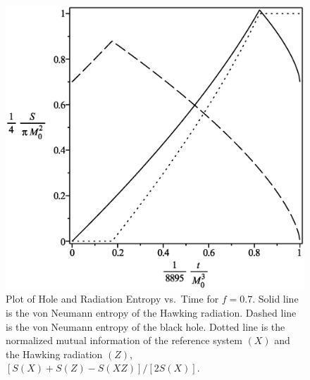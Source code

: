 \documentclass[12pt]{article}
\begin{document}
\begin{figure}[H]
\centering
\includegraphics[width=1\textwidth]{Hawking-hole-radiation-mutual-entropy-vs-time-graph-10f-is-7.eps}
\caption{Plot of Hole and Radiation Entropy vs.\ Time for $f=0.7$.
Solid line is the von Neumann entropy of the Hawking radiation.
Dashed line is the von Neumann entropy of the black hole.
Dotted line is the normalized mutual information of the reference system $(X)$ and the Hawking radiation $(Z)$, $[S(X)+S(Z)-S(XZ)]/[2S(X)]$.}
\end{figure}
\end{document}
